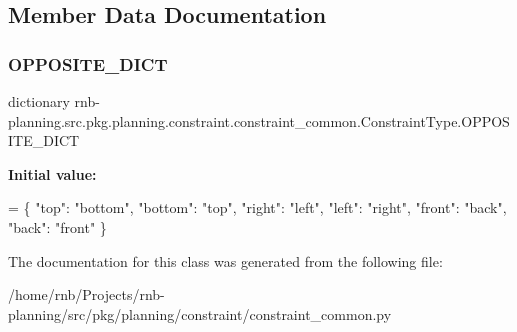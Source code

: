 \subsection{Member Data Documentation}
\mbox{\label{classrnb-planning_1_1src_1_1pkg_1_1planning_1_1constraint_1_1constraint__common_1_1_constraint_type_a6e4193f46f8addffdf54b20152f29330}} 
\subsubsection{\texorpdfstring{O\+P\+P\+O\+S\+I\+T\+E\+\_\+\+D\+I\+CT}{OPPOSITE\_DICT}}
{\footnotesize\ttfamily dictionary rnb-\/planning.\+src.\+pkg.\+planning.\+constraint.\+constraint\+\_\+common.\+Constraint\+Type.\+O\+P\+P\+O\+S\+I\+T\+E\+\_\+\+D\+I\+CT\hspace{0.3cm}{\ttfamily [static]}}

{\bfseries Initial value\+:}
\begin{DoxyCode}
= \{
    \textcolor{stringliteral}{"top"}: \textcolor{stringliteral}{"bottom"},
    \textcolor{stringliteral}{"bottom"}: \textcolor{stringliteral}{"top"},
    \textcolor{stringliteral}{"right"}: \textcolor{stringliteral}{"left"},
    \textcolor{stringliteral}{"left"}: \textcolor{stringliteral}{"right"},
    \textcolor{stringliteral}{"front"}: \textcolor{stringliteral}{"back"},
    \textcolor{stringliteral}{"back"}: \textcolor{stringliteral}{"front"}
\}
\end{DoxyCode}


The documentation for this class was generated from the following file\+:\begin{DoxyCompactItemize}
\item 
/home/rnb/\+Projects/rnb-\/planning/src/pkg/planning/constraint/constraint\+\_\+common.\+py\end{DoxyCompactItemize}
